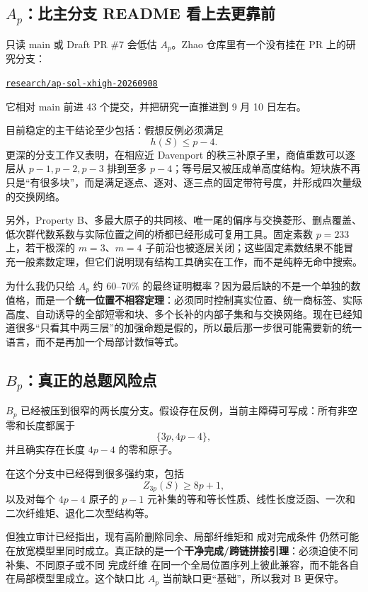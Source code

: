 \documentclass[11pt,a4paper]{ctexart}
\newcommand{\repo}[2]{\href{#2}{\texttt{#1}}}
\begin{document}
\subsection{$A_p$：比主分支 README 看上去更靠前}

只读 main 或 Draft PR \#7 会低估 $A_p$。Zhao 仓库里有一个没有挂在 PR 上的研究分支：
\begin{center}
\repo{research/ap-sol-xhigh-20260908}{https://github.com/randomcat4/zhao/tree/research/ap-sol-xhigh-20260908}
\end{center}
它相对 main 前进 43 个提交，并把研究一直推进到 9 月 10 日左右。

目前稳定的主干结论至少包括：假想反例必须满足
\[
h(S)\le p-4.
\]
更深的分支工作又表明，在相应近 Davenport 的秩三补原子里，商值重数可以逐层从 $p-1,p-2,p-3$ 排到至多 $p-4$；等号层又被压成单高度结构。短块族不再只是“有很多块”，而是满足逐点、逐对、逐三点的固定带符号度，并形成四次量级的交换网络。

另外，Property B、多最大原子的共同核、唯一尾的偏序与交换菱形、删点覆盖、低次群代数系数与实际位置之间的桥都已经形成可复用工具。固定素数 $p=233$ 上，若干极深的 $m=3$、$m=4$ 子前沿也被逐层关闭；这些固定素数结果不能冒充一般素数定理，但它们说明现有结构工具确实在工作，而不是纯粹无命中搜索。

为什么我仍只给 $A_p$ 约 60--70\% 的最终证明概率？因为最后缺的不是一个单独的数值格，而是一个\textbf{统一位置不相容定理}：必须同时控制真实位置、统一商标签、实际高度、自动诱导的全部短零和块、多个长补的内部子集和与交换网络。现在已经知道很多“只看其中两三层”的加强命题是假的，所以最后那一步很可能需要新的统一语言，而不是再加一个局部计数恒等式。

\subsection{$B_p$：真正的总题风险点}

$B_p$ 已经被压到很窄的两长度分支。假设存在反例，当前主障碍可写成：所有非空零和长度都属于
\[
\{3p,4p-4\},
\]
并且确实存在长度 $4p-4$ 的零和原子。

在这个分支中已经得到很多强约束，包括
\[
Z_{3p}(S)\ge8p+1,
\]
以及对每个 $4p-4$ 原子的 $p-1$ 元补集的等和等长性质、线性长度泛函、一次和二次纤维矩、退化二次型结构等。

但独立审计已经指出，现有高阶删除同余、局部纤维矩和 成对完成条件 仍然可能在放宽模型里同时成立。真正缺的是一个\textbf{干净完成/跨链拼接引理}：必须迫使不同补集、不同原子或不同 完成纤维 在同一个全局位置序列上彼此兼容，而不能各自在局部模型里成立。这个缺口比 $A_p$ 当前缺口更“基础”，所以我对 B 更保守。
\end{document}
